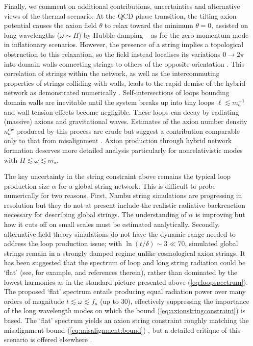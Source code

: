 \documentclass[preprint,nofootinbib]{revtex4}
\begin{document}
Finally, we comment on additional contributions, uncertainties and alternative views of the thermal scenario. At the QCD phase transition, the tilting axion potential causes the axion field $\theta$ to relax toward the minimum $\theta=0$, assisted on long wavelengths ($\omega\sim H$) by Hubble damping -- as for the zero momentum mode in inflationary scenarios. However, the presence of a string implies a topological obstruction to this relaxation, so the field instead localises its variations $0\rightarrow 2\pi$ into domain walls connecting strings to others of the opposite orientation \cite{Sikivie:1982qv, Vilenkin:1982ks}. This correlation of strings within the network, as well as the intercommuting properties of strings colliding with walls, leads to the rapid demise of the hybrid network as demonstrated numerically \cite{Shellard:1986in, Shellard:1987}. Self-intersections of loops bounding domain walls are inevitable until the system breaks up into tiny loops $\ell \lesssim m_a^{-1}$ and wall tension effects become negligible. These loops can decay by radiating (massive) axions and gravitational waves. Estimates of the axion number density $n_a^{\mathrm{dw}}$ produced by this process are crude but suggest a contribution comparable only to that from misalignment \cite{Chang:1998tb}. Axion production through hybrid network formation deserves more detailed analysis particularly for nonrelativistic modes with $H \lesssim \omega \lesssim m_a$.

The key uncertainty in the string constraint above remains the typical loop production size $\alpha$ for a global string network. This is difficult to probe numerically for two reasons. First, Nambu string simulations are progressing in resolution but they do not at present include the realistic radiative backreaction necessary for describing global strings. The understanding of $\alpha$ is improving but how it cuts off on small scales must be estimated analytically. Secondly, alternative field theory simulations do not have the dynamic range needed to
address the loop production issue; with $\ln(t/\delta) \sim 3 \ll 70$, simulated global strings remain in a strongly damped regime unlike cosmological axion strings. It has been suggested that the spectrum of loop and long string radiation could be `flat' (see, for example, \cite{Sikivie:2006ni} and references therein), rather than dominated by the lowest harmonics as in the standard picture presented above (\ref{eq:loopspectrum}). The proposed `flat' spectrum entails producing equal radiation power over many orders of magnitude $t \lesssim \omega \lesssim f_a$ (up to 30), effectively suppressing the importance of the long wavelength modes on which the bound (\ref{eq:axionstringconstraint}) is based. The `flat' spectrum yields an axion string constraint roughly matching the misalignment bound (\ref{eq:misalignment:bound}) \cite{hagmann:chang:sikivie:axion:string}, but a detailed critique of this scenario is offered elsewhere \cite{Battye:1997jk}.
\end{document}
